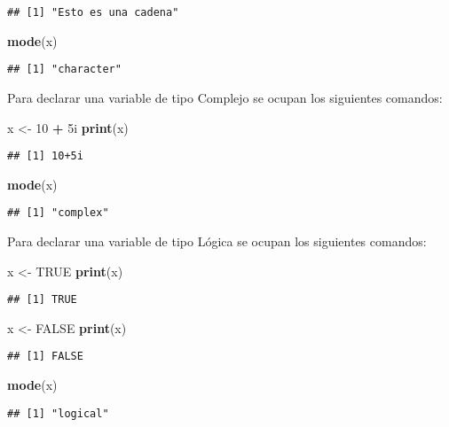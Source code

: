 \documentclass[11pt,]{article}
\newenvironment{Shaded}{\begin{snugshade}}{\end{snugshade}}
\newcommand{\DecValTok}[1]{\textcolor[rgb]{0.00,0.00,0.81}{#1}}
\newcommand{\KeywordTok}[1]{\textcolor[rgb]{0.13,0.29,0.53}{\textbf{#1}}}
\newcommand{\NormalTok}[1]{#1}
\newcommand{\OperatorTok}[1]{\textcolor[rgb]{0.81,0.36,0.00}{\textbf{#1}}}
\newcommand{\OtherTok}[1]{\textcolor[rgb]{0.56,0.35,0.01}{#1}}
\newcommand{\StringTok}[1]{\textcolor[rgb]{0.31,0.60,0.02}{#1}}
\begin{document}
\begin{verbatim}
## [1] "Esto es una cadena"
\end{verbatim}

\begin{Shaded}
\begin{Highlighting}[]
\KeywordTok{mode}\NormalTok{(x)}
\end{Highlighting}
\end{Shaded}

\begin{verbatim}
## [1] "character"
\end{verbatim}

Para declarar una variable de tipo Complejo se ocupan los siguientes
comandos:

\begin{Shaded}
\begin{Highlighting}[]
\NormalTok{x <-}\StringTok{ }\DecValTok{10} \OperatorTok{+}\StringTok{ }\NormalTok{5i}
\KeywordTok{print}\NormalTok{(x)}
\end{Highlighting}
\end{Shaded}

\begin{verbatim}
## [1] 10+5i
\end{verbatim}

\begin{Shaded}
\begin{Highlighting}[]
\KeywordTok{mode}\NormalTok{(x)}
\end{Highlighting}
\end{Shaded}

\begin{verbatim}
## [1] "complex"
\end{verbatim}

Para declarar una variable de tipo Lógica se ocupan los siguientes
comandos:

\begin{Shaded}
\begin{Highlighting}[]
\NormalTok{x <-}\StringTok{ }\OtherTok{TRUE}
\KeywordTok{print}\NormalTok{(x)}
\end{Highlighting}
\end{Shaded}

\begin{verbatim}
## [1] TRUE
\end{verbatim}

\begin{Shaded}
\begin{Highlighting}[]
\NormalTok{x <-}\StringTok{ }\OtherTok{FALSE}
\KeywordTok{print}\NormalTok{(x)}
\end{Highlighting}
\end{Shaded}

\begin{verbatim}
## [1] FALSE
\end{verbatim}

\begin{Shaded}
\begin{Highlighting}[]
\KeywordTok{mode}\NormalTok{(x)}
\end{Highlighting}
\end{Shaded}

\begin{verbatim}
## [1] "logical"
\end{verbatim}

\newpage
\singlespacing 
\end{document}
